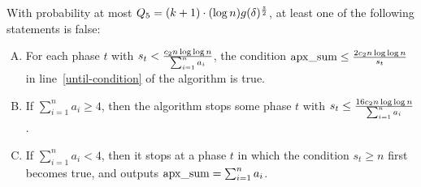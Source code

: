 \documentclass[runningheads]{llncs}
\newcommand{\appsum}{{\rm apx\_sum}}
\begin{document}
\begin{lemma}\label{lemma.5}
With probability at most $Q_5=(k+1)\cdot (\log n) g(\delta)^{z\over
2}$,  at least one of the following statements is false:
\begin{enumerate}[A.]
\item\label{clm5-a}
For each phase $t$ with $s_t<{c_2n\log\log n\over \sum_{i=1}^n
a_i}$,  the condition $\appsum\le {2c_2n\log\log n\over s_t}$ in
line~\ref{until-condition} of the algorithm is true.
\item\label{clm5-b}
If $\sum_{i=1}^na_i\ge 4$, then the algorithm stops some phase $t$
with $s_t\le {16c_2n\log\log n\over \sum_{i=1}^n a_i}$.

\item\label{clm5-c}
If $\sum_{i=1}^na_i< 4$, then it stops  at a phase $t$ in which the
condition $s_t\ge n$ first becomes true, and outputs
$\appsum=\sum_{i=1}^n a_i$.
\end{enumerate}
\end{lemma}
\end{document}
